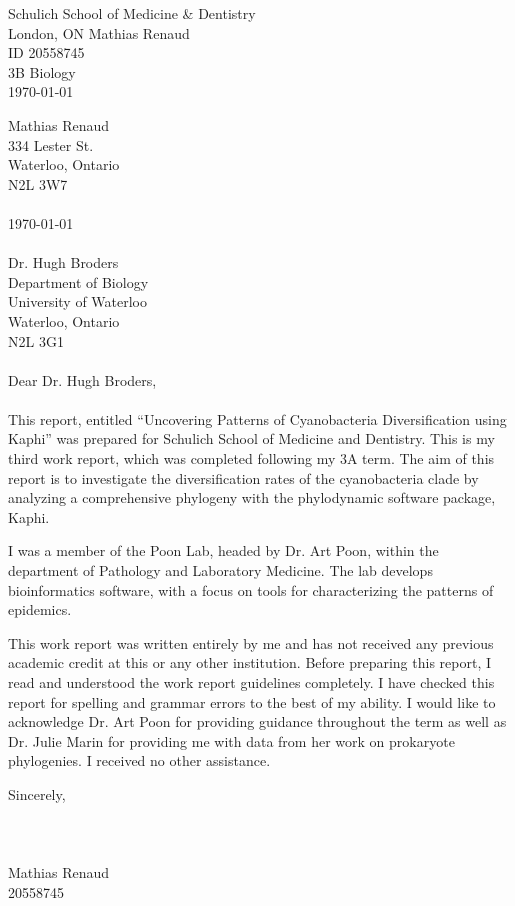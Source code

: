 \documentclass[12pt]{article}
\begin{document}
{
	Schulich School of Medicine \& Dentistry\\
	London, ON
	}{
	Mathias Renaud\\
	ID 20558745\\
	3B Biology \\
	\today
}


\begin{UWletter}
\thispagestyle{empty}
Mathias Renaud\\
334 Lester St.\\
Waterloo, Ontario\\
N2L 3W7\\
\\
\today\\
\\
Dr. Hugh Broders\\
Department of Biology\\
University of Waterloo\\
Waterloo, Ontario\\
N2L 3G1\\
\\
Dear Dr. Hugh Broders,\\
\\
This report, entitled ``Uncovering Patterns of Cyanobacteria Diversification using Kaphi'' was prepared for Schulich School of Medicine and Dentistry. This is my third work report, which was completed following my 3A term.  The aim of this report is to investigate the diversification rates of the cyanobacteria clade by analyzing a comprehensive phylogeny with the phylodynamic software package, Kaphi.

I was a member of the Poon Lab, headed by Dr. Art Poon, within the department of Pathology and Laboratory Medicine. The lab develops bioinformatics software, with a focus on tools for characterizing the patterns of epidemics.

This work report was written entirely by me and has not received any previous academic credit at this or any other institution. Before preparing this report, I read and understood the work report guidelines completely. I have checked this report for spelling and grammar errors to the best of my ability. I would like to acknowledge Dr. Art Poon for providing guidance throughout the term as well as Dr. Julie Marin for providing me with data from her work on prokaryote phylogenies. I received no other assistance.

Sincerely,\\
\\
\\
\\
Mathias Renaud\\
20558745
\end{UWletter}
\end{document}

